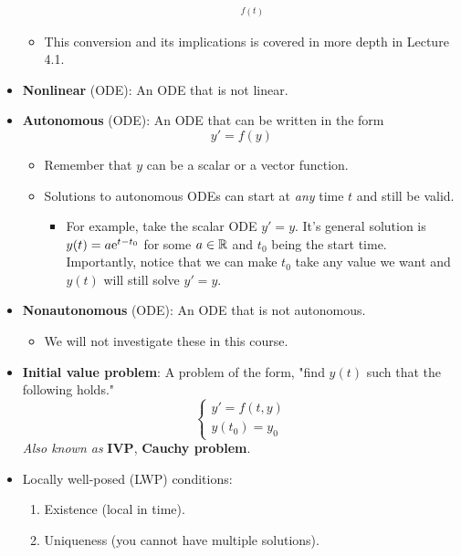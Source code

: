 \documentclass[../notes.tex]{subfiles}
\begin{document}
\begin{itemize}
\begin{itemize}
\begin{align*}
{            }_{f(t)}
        \end{align*}
        \item This conversion and its implications is covered in more depth in Lecture 4.1.
    \end{itemize}
    \item \textbf{Nonlinear} (ODE): An ODE that is not linear.
    \item \textbf{Autonomous} (ODE): An ODE that can be written in the form
    \begin{equation*}
        y' = f(y)
    \end{equation*}
    \begin{itemize}
        \item Remember that $y$ can be a scalar or a vector function.
        \item Solutions to autonomous ODEs can start at \emph{any} time $t$ and still be valid.
        \begin{itemize}
            \item For example, take the scalar ODE $y'=y$. It's general solution is $y(t)=a\e[t-t_0]$ for some $a\in\R$ and $t_0$ being the start time. Importantly, notice that we can make $t_0$ take any value we want and $y(t)$ will still solve $y'=y$.
        \end{itemize}
    \end{itemize}
    \item \textbf{Nonautonomous} (ODE): An ODE that is not autonomous.
    \begin{itemize}
        \item We will not investigate these in this course.
    \end{itemize}
    \item \textbf{Initial value problem}: A problem of the form, "find $y(t)$ such that the following holds."
    \begin{equation*}
        \begin{cases}
            y' = f(t,y)\\
            y(t_0) = y_0
        \end{cases}
    \end{equation*}
    \emph{Also known as} \textbf{IVP}, \textbf{Cauchy problem}.
    \item Locally well-posed (LWP) conditions:
    \begin{enumerate}
        \item Existence (local in time).
        \item Uniqueness (you cannot have multiple solutions).

\end{enumerate}
\end{itemize}
\end{document}
